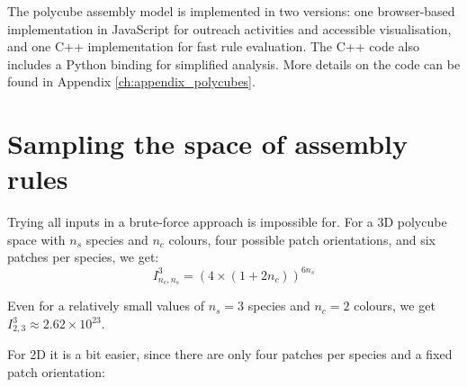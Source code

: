 The polycube assembly model is implemented in two versions: one browser-based implementation in JavaScript for outreach activities and accessible visualisation, and one C++ implementation for fast rule evaluation. The C++ code also includes a Python binding for simplified analysis. More details on the code can be found in Appendix \ref{ch:appendix_polycubes}.




\section{Sampling the space of assembly rules}
Trying all inputs in a brute-force approach is impossible for. For a 3D polycube space with \(n_s\) species and \(n_c\) colours, four possible patch orientations, and six patches per species, we get: 
\[
I_{n_c, n_s}^3 = (4 \times (1+2n_c))^{6n_s}
\]

Even for a relatively small values of \(n_s=3\) species and \(n_c=2\) colours, we get \(I_{2, 3}^3 \approx 2.62 \times 10^{23}\).

For 2D it is a bit easier, since there are only four patches per species and a fixed patch orientation:

